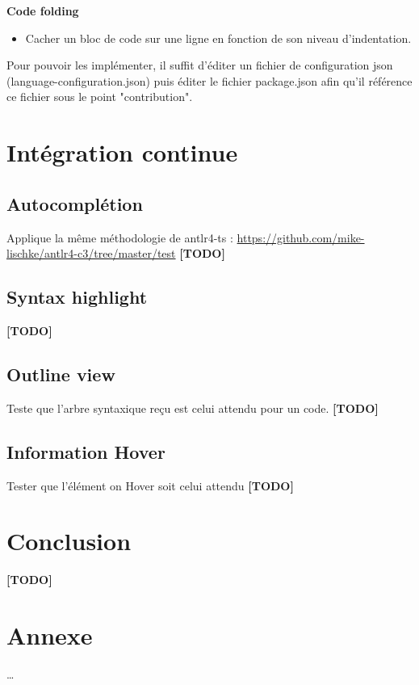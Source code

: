 \documentclass[
    iict, %
    il, %
]{heig-tb}
\begin{document}
\textbf{Code folding}
\begin{itemize}
    \item Cacher un bloc de code sur une ligne en fonction de son niveau d'indentation.
\end{itemize}

Pour pouvoir les implémenter, il suffit d'éditer un fichier de configuration json (language-configuration.json) puis  éditer le fichier package.json afin qu'il référence ce fichier sous le point "contribution".

\chapter{Intégration continue}

\section{Autocomplétion}
Applique la même méthodologie de antlr4-ts : \href{https://github.com/mike-lischke/antlr4-c3/tree/master/test}{https://github.com/mike-lischke/antlr4-c3/tree/master/test}
\textbf{[TODO]}

\section{Syntax highlight}
\textbf{[TODO]}

\section{Outline view}
Teste que l'arbre syntaxique reçu est celui attendu pour un code.
\textbf{[TODO]}

\section{Information Hover}
Tester que l'élément on Hover soit celui attendu
\textbf{[TODO]}

\chapter{Conclusion}
\textbf{[TODO]}



\chapter{Annexe}
\dots


\end{document}
